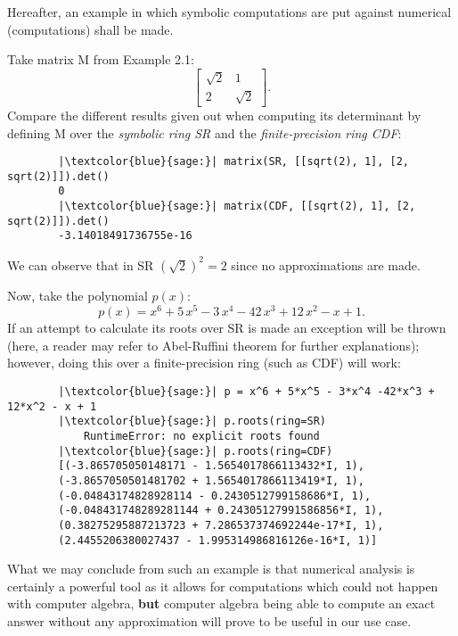 Hereafter, an example in which symbolic computations are put against numerical (computations) shall be made.
\begin{example}
    Take matrix M from Example 2.1:
    \[
        \begin{bmatrix}
            \sqrt{2}  &   1    \\
                2     & \sqrt{2}
        \end{bmatrix}.
    \]
    Compare the different results given out when computing its determinant by defining M over the \textit{symbolic ring SR} and
    the \textit{finite-precision ring CDF}:
    \begin{verbatim}
        |\textcolor{blue}{sage:}| matrix(SR, [[sqrt(2), 1], [2, sqrt(2)]]).det()
        0
        |\textcolor{blue}{sage:}| matrix(CDF, [[sqrt(2), 1], [2, sqrt(2)]]).det()
        -3.14018491736755e-16
    \end{verbatim}
    We can observe that in SR \((\sqrt{2})^2 = 2\) since no approximations are made.

    Now, take the polynomial \(p(x)\):
    \[
        p(x) = x^{6} + 5 \, x^{5} - 3 \, x^{4} - 42 \, x^{3} + 12 \, x^{2} - x + 1.
    \]
    If an attempt to calculate its roots over SR is made an exception will be thrown (here, a reader may refer to
    Abel-Ruffini theorem for further explanations); however, doing this over a finite-precision ring (such as CDF) will work:
    \begin{verbatim}
        |\textcolor{blue}{sage:}| p = x^6 + 5*x^5 - 3*x^4 -42*x^3 + 12*x^2 - x + 1
        |\textcolor{blue}{sage:}| p.roots(ring=SR)
            RuntimeError: no explicit roots found
        |\textcolor{blue}{sage:}| p.roots(ring=CDF)
        [(-3.865705050148171 - 1.5654017866113432*I, 1),
        (-3.8657050501481702 + 1.5654017866113419*I, 1),
        (-0.04843174828928114 - 0.2430512799158686*I, 1),
        (-0.048431748289281144 + 0.24305127991586856*I, 1),
        (0.38275295887213723 + 7.286537374692244e-17*I, 1),
        (2.4455206380027437 - 1.995314986816126e-16*I, 1)]
    \end{verbatim}
\end{example}

What we may conclude from such an example is that numerical analysis is certainly a powerful tool as it allows for computations
which could not happen with computer algebra, \textbf{but} computer algebra being able to compute an exact answer without
any approximation will prove to be useful in our use case.

